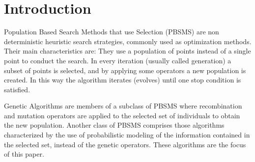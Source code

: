 \documentclass[runningheads]{llncs}
\begin{document}
 
\author{Roberto Santana } 
 
 
 
\maketitle 
 
\begin{abstract} 
  This paper analyzes the behavior of the Mixture of Trees Factorized
  Distribution Algorithm (MT-FDA) when priors are incorporated. It is shown
  that the addition
  of priors provokes a mutation like effect during the search. Adaptive priors that relate the rate of
  mutation to the quality of the search are also introduced. Additionally, the
  learning step of the MT-FDA is changed to avoid the overfitting of data. The
  results of the experiments show that our proposals improve the trade off
  between exploration and exploitation displayed by the MT-FDA. 

\end{abstract} 
 
 
\section{Introduction} 
 


Population Based Search Methods that use Selection  (PBSMS) are non deterministic
heuristic search strategies, commonly used as optimization methods. Their main
characteristics are: They use a population of points instead  of a single
point to conduct the search. In every iteration (usually called generation) a
subset of points is  selected, and  by applying some operators a new population is created. In  this way the algorithm iterates (evolves) until one stop condition is  satisfied.  
  
    Genetic Algorithms \cite{Holland:1975} are members of a subclass of
    PBSMS where recombination and mutation operators are applied to the selected  set
    of individuals to obtain the new population. Another class of PBSMS  comprises
    those algorithms    characterized by the use of probabilistic modeling of the information  contained
    in the selected set, instead of the genetic operators. These  algorithms are the
    focus of this paper. 
\end{document}
